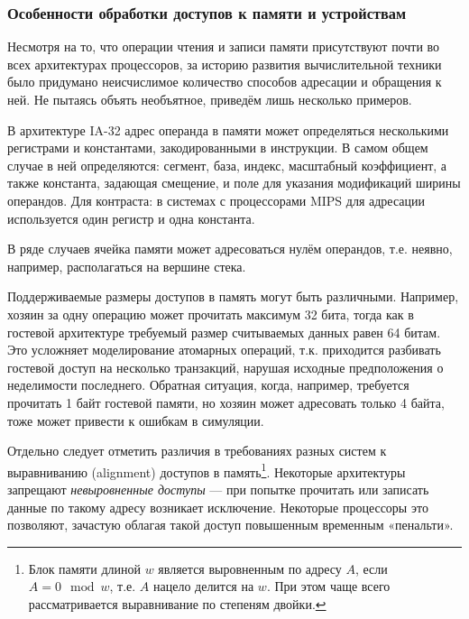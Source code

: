 \subsubsection{Особенности обработки доступов к памяти и устройствам}

Несмотря на то, что операции чтения и записи памяти присутствуют почти во всех архитектурах процессоров, за историю развития вычислительной техники было придумано неисчислимое количество способов адресации и обращения к ней. Не пытаясь объять необъятное, приведём лишь несколько примеров.

\begin{itemize*}

\item В архитектуре IA-32 адрес операнда в памяти может определяться несколькими регистрами и константами, закодированными в инструкции. В самом общем случае в ней определяются: сегмент, база, индекс, масштабный коэффициент, а также константа, задающая смещение, и поле для указания модификаций ширины операндов. Для контраста: в системах с процессорами MIPS для адресации используется один регистр и одна константа.

\item В ряде случаев ячейка памяти может адресоваться нулём операндов, т.е. неявно, например, располагаться на вершине стека.

\item Поддерживаемые размеры доступов в память могут быть различными. Например, хозяин за одну операцию может прочитать максимум 32 бита, тогда как в гостевой архитектуре требуемый размер считываемых данных равен 64 битам. Это усложняет моделирование атомарных операций, т.к. приходится разбивать гостевой доступ на несколько транзакций, нарушая исходные предположения о неделимости последнего. Обратная ситуация, когда, например, требуется прочитать 1 байт гостевой памяти, но хозяин может адресовать только 4 байта, тоже может привести к ошибкам в симуляции.

\item Отдельно следует отметить различия в требованиях разных систем к выравниванию (\abbr alignment) доступов в память\footnote{Блок памяти длиной $w$ является выровненным по адресу $A$, если $A = 0 \mod w$, т.е. $A$ нацело делится на $w$. При этом чаще всего рассматривается выравнивание по степеням двойки.}. Некоторые архитектуры запрещают \textit{невыровненные доступы} --- при попытке прочитать или записать данные по такому адресу возникает исключение. Некоторые процессоры это позволяют, зачастую облагая такой доступ повышенным временным «пенальти».
\end{itemize*}

